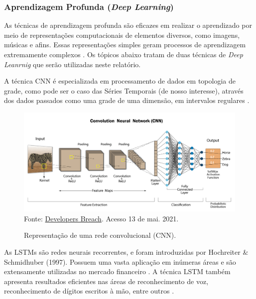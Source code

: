 \subsubsection{Aprendizagem Profunda (\textit{Deep Learning})}

\par
As técnicas de aprendizagem profunda são eficazes em realizar o aprendizado por meio de representações computacionais de elementos diversos, como imagens, músicas e afins. Essas representações simples geram processos de aprendizagem extremamente complexos \cite{GoodBengCour16}. Os tópicos abaixo tratam de duas técnicas de \textit{Deep Leanrnig} que serão utilizadas neste relatório.


\par
A técnica CNN é especializada em processamento de dados em topologia de grade, como pode ser o caso das Séries Temporais (de nosso interesse), através dos dados passados como uma grade de uma dimensão, em intervalos regulares \cite{GoodBengCour16}.


\begin{figure}[H]
\centering
\caption{Representação de uma rede convolucional (CNN).}
  \includegraphics[scale=0.33]{figures/cnn_banner.png}
  Fonte: \href{https://developersbreach.com/convolution-neural-network-deep-learning/}{Developers Breach}. Acesso 13 de mai. 2021.
\end{figure}



\par
As LSTMs são redes neurais recorrentes, e foram introduzidas por Hochreiter \& Schmidhuber (1997). Possuem uma vasta aplicação em inúmeras áreas e são extensamente utilizadas no mercado financeiro \cite{castelao}. A técnica LSTM também apresenta resultados eficientes nas áreas de reconhecimento de voz, reconhecimento de dígitos escritos à mão, entre outros \cite{GoodBengCour16}.


